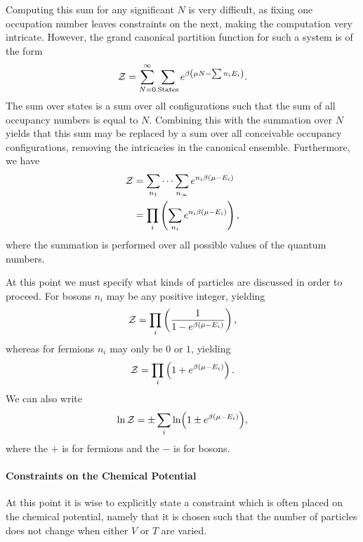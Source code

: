 Computing this sum for any significant $N$ is very difficult, as fixing one occupation number leaves constraints on the next, making the computation very intricate. However, the grand canonical partition function for such a system is of the form
\begin{align*}
	\mathcal{Z} = \sum\limits_{N = 0}^{\infty}\sum\limits_{\text{States}}e^{\beta\left(\mu N - \sum n_{i}E_{i}\right)}.
\end{align*}
The sum over states is a sum over all configurations such that the sum of all occupancy numbers is equal to $N$. Combining this with the summation over $N$ yields that this sum may be replaced by a sum over all conceivable occupancy configurations, removing the intricacies in the canonical ensemble. Furthermore, we have
\begin{align*}
	\mathcal{Z} &= \sum\limits_{n_{1}}\dots\sum\limits_{n_{\infty}}e^{n_{i}\beta(\mu - E_{i})} \\
	   &= \prod\limits_{i}\left(\sum\limits_{n_{i}}e^{n_{i}\beta(\mu - E_{i})}\right),
\end{align*}
where the summation is performed over all possible values of the quantum numbers.

At this point we must specify what kinds of particles are discussed in order to proceed. For bosons $n_{i}$ may be any positive integer, yielding
\begin{align*}
	\mathcal{Z} = \prod\limits_{i}\left(\frac{1}{1 - e^{\beta(\mu - E_{i})}}\right),
\end{align*}
whereas for fermions $n_{i}$ may only be $0$ or $1$, yielding
\begin{align*}
	\mathcal{Z} = \prod\limits_{i}\left(1 + e^{\beta(\mu - E_{i})}\right).
\end{align*}
We can also write
\begin{align*}
	\ln{\mathcal{Z}} = \pm\sum\limits_{i}\ln(1 \pm e^{\beta(\mu - E_{i})}),
\end{align*}
where the $+$ is for fermions and the $-$ is for bosons.

\paragraph{Constraints on the Chemical Potential}
At this point it is wise to explicitly state a constraint which is often placed on the chemical potential, namely that it is chosen such that the number of particles does not change when either $V$ or $T$ are varied.

